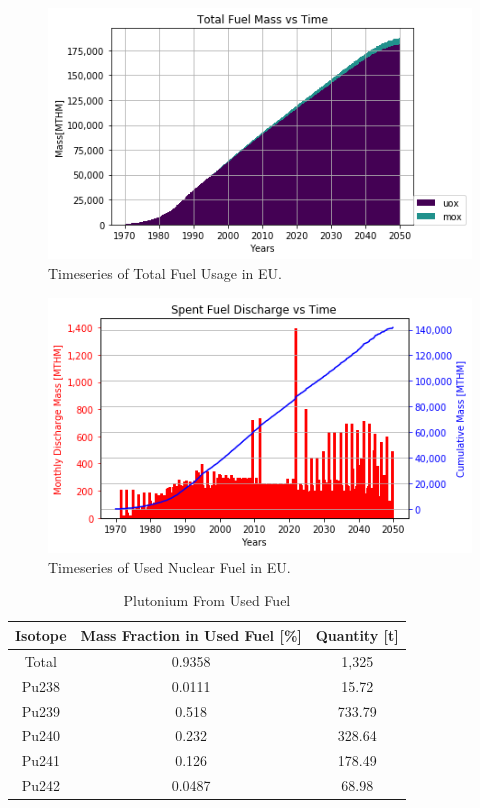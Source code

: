 \begin{figure}[htbp!]
	\begin{center}
		\includegraphics[scale=0.7]{./images/eu_future/total_fuel.png}
	\end{center}
	\caption{Timeseries of Total Fuel Usage in \gls{EU}.}
	\label{fig:eu_fuel}
\end{figure}


\begin{figure}[htbp!]
	\begin{center}
			\includegraphics[scale=0.7]{./images/eu_future/snf_discharge.png}
	\end{center}
	\caption{Timeseries of Used Nuclear Fuel in \gls{EU}.}
	\label{fig:eu_snf}
\end{figure}
\FloatBarrier


\begin{table}[h]
	\centering
	\begin{tabular}{|c|c|c|}
		\hline
		Isotope & Mass Fraction in Used Fuel [\%] & Quantity [t] \\ \hline
		Total & 0.9358 & 1,325 \\ \hline
		Pu238 & 0.0111 & 15.72 \\ \hline
		Pu239 & 0.518 & 733.79 \\ \hline
		Pu240 & 0.232 & 328.64 \\ \hline
		Pu241 & 0.126 & 178.49 \\ \hline
		Pu242 & 0.0487 & 68.98 \\ \hline
	\end{tabular}
	\caption{Plutonium From Used Fuel}
	\label{tab:pu}
\end{table}


